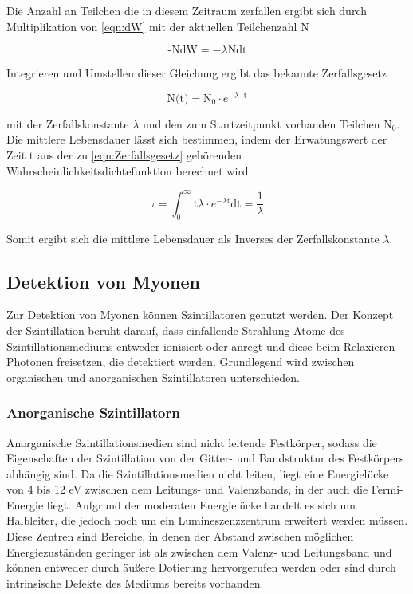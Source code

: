         Die Anzahl an Teilchen die in diesem Zeitraum zerfallen ergibt sich durch Multiplikation von \eqref{eqn:dW} mit der aktuellen Teilchenzahl N

        \begin{equation*}
            \text{-NdW} = -\lambda \text{Ndt}
        \end{equation*}

        Integrieren und Umstellen dieser Gleichung ergibt das bekannte Zerfallsgesetz
        
        \begin{equation}
            \text{N(t)} = \text{N}_0 \cdot e^{- \lambda \cdot \text{t}}
            \label{eqn:Zerfallsgesetz}
        \end{equation}

        mit der Zerfallskonstante $\lambda$ und den zum Startzeitpunkt vorhanden Teilchen $\text{N}_0$. Die mittlere Lebensdauer lässt sich bestimmen, indem der Erwatungswert der Zeit t aus der zu 
        \eqref{eqn:Zerfallsgesetz} gehörenden Wahrscheinlichkeitsdichtefunktion berechnet wird.

        \begin{equation}
            \tau = \int_0^{\infty} \text{t} \lambda \cdot e^{-\lambda \text{t}} \text{dt} = \frac{1}{\lambda}
            \label{eqn:mittlere_Lebensdauer}
        \end{equation}

        Somit ergibt sich die mittlere Lebensdauer als Inverses der Zerfallskonstante $\lambda$.

    \subsection{Detektion von Myonen}
        Zur Detektion von Myonen können Szintillatoren genutzt werden. Der Konzept der Szintillation beruht darauf, dass einfallende Strahlung Atome des Szintillationsmediums entweder ionisiert oder anregt und 
        diese beim Relaxieren Photonen freisetzen, die detektiert werden. Grundlegend wird zwischen organischen und anorganischen Szintillatoren unterschieden.

            \subsubsection*{Anorganische Szintillatorn}
                Anorganische Szintillationsmedien sind nicht leitende Festkörper, sodass die Eigenschaften der Szintillation von der Gitter- und Bandstruktur des Festkörpers abhängig sind. Da die 
                Szintillationsmedien nicht leiten, liegt eine Energielücke von 4 bis 12 eV zwischen dem Leitungs- und Valenzbands, in der auch die Fermi-Energie liegt. Aufgrund der moderaten Energielücke 
                handelt es sich um Halbleiter, die jedoch noch um ein Lumineszenzzentrum erweitert werden müssen. Diese Zentren sind Bereiche, in denen der Abstand zwischen möglichen Energiezuständen geringer 
                ist als zwischen dem Valenz- und Leitungsband und können entweder durch äußere Dotierung hervorgerufen werden oder sind durch intrinsische Defekte des Mediums bereits vorhanden.
                
